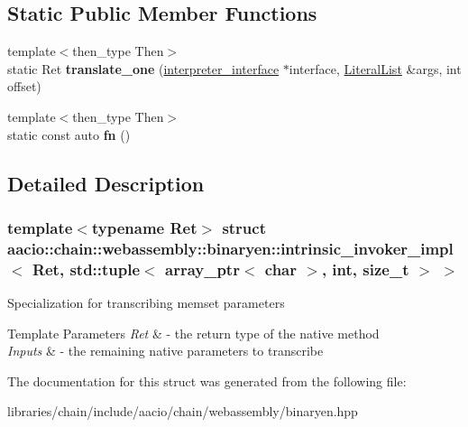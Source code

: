 \subsection*{Static Public Member Functions}
\begin{DoxyCompactItemize}
\item 
\mbox{\label{structaacio_1_1chain_1_1webassembly_1_1binaryen_1_1intrinsic__invoker__impl_3_01_ret_00_01std_1_c2994fb49e25761823d7a1668f557a77_a5e26e5df90d753764dc3515cbcac3f45}} 
{\footnotesize template$<$then\+\_\+type Then$>$ }\\static Ret {\bfseries translate\+\_\+one} (\mbox{\hyperlink{structaacio_1_1chain_1_1webassembly_1_1binaryen_1_1interpreter__interface}{interpreter\+\_\+interface}} $\ast$interface, \mbox{\hyperlink{classstd_1_1vector}{Literal\+List}} \&args, int offset)
\item 
\mbox{\label{structaacio_1_1chain_1_1webassembly_1_1binaryen_1_1intrinsic__invoker__impl_3_01_ret_00_01std_1_c2994fb49e25761823d7a1668f557a77_a301e9e410ebcef602a7b851027d389f5}} 
{\footnotesize template$<$then\+\_\+type Then$>$ }\\static const auto {\bfseries fn} ()
\end{DoxyCompactItemize}


\subsection{Detailed Description}
\subsubsection*{template$<$typename Ret$>$\newline
struct aacio\+::chain\+::webassembly\+::binaryen\+::intrinsic\+\_\+invoker\+\_\+impl$<$ Ret, std\+::tuple$<$ array\+\_\+ptr$<$ char $>$, int, size\+\_\+t $>$ $>$}

Specialization for transcribing memset parameters


\begin{DoxyTemplParams}{Template Parameters}
{\em Ret} & -\/ the return type of the native method \\
\hline
{\em Inputs} & -\/ the remaining native parameters to transcribe \\
\hline
\end{DoxyTemplParams}


The documentation for this struct was generated from the following file\+:\begin{DoxyCompactItemize}
\item 
libraries/chain/include/aacio/chain/webassembly/binaryen.\+hpp\end{DoxyCompactItemize}
